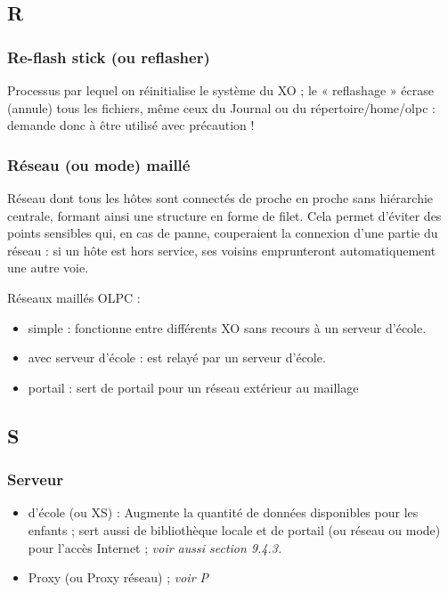 \documentclass[12pt]{article}
\begin{document}
\subsection{R}
\label{sec-14-14}
\subsubsection{Re-flash stick (ou reflasher)}
\label{sec-14-14-1}


Processus par lequel on réinitialise le système du XO ; le « reflashage »
écrase (annule) tous les fichiers, même ceux du Journal ou du
répertoire/home/olpc : demande donc à être utilisé avec précaution !
\subsubsection{Réseau (ou mode) maillé}
\label{sec-14-14-2}


Réseau dont tous les hôtes sont connectés de proche en proche sans
hiérarchie centrale, formant ainsi une structure en forme de filet. Cela
permet d'éviter des points sensibles qui, en cas de panne, couperaient la
connexion d'une partie du réseau : si un hôte est hors service, ses voisins
emprunteront automatiquement une autre voie.

Réseaux maillés OLPC :

\begin{itemize}
\item simple : fonctionne entre différents XO sans recours à un serveur d'école.
\item avec serveur d'école : est relayé par un serveur d'école.
\item portail : sert de portail pour un réseau extérieur au maillage
\end{itemize}
\subsection{S}
\label{sec-14-15}
\subsubsection{Serveur}
\label{sec-14-15-1}


\begin{itemize}
\item d'école (ou XS) : Augmente la quantité de données disponibles pour les
  enfants ; sert aussi de bibliothèque locale et de portail (ou réseau ou
  mode) pour l'accès Internet ; \emph{voir aussi section 9.4.3.}
\item Proxy (ou Proxy réseau) ; \emph{voir P}
\end{itemize}
\end{document}
